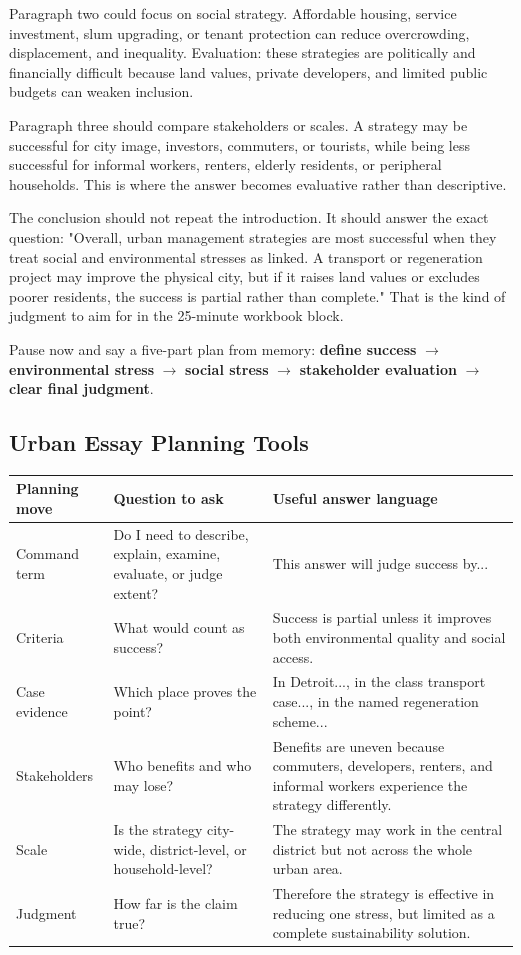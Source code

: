 \documentclass[11pt,a4paper]{article}
\newcommand{\term}[1]{\textcolor{HeadingBlue}{\textbf{#1}}}
\begin{document}
Paragraph two could focus on social strategy. Affordable housing, service
investment, slum upgrading, or tenant protection can reduce overcrowding,
displacement, and inequality. Evaluation: these strategies are politically and
financially difficult because land values, private developers, and limited
public budgets can weaken inclusion.

Paragraph three should compare stakeholders or scales. A strategy may be
successful for city image, investors, commuters, or tourists, while being less
successful for informal workers, renters, elderly residents, or peripheral
households. This is where the answer becomes evaluative rather than descriptive.

The conclusion should not repeat the introduction. It should answer the exact
question: "Overall, urban management strategies are most successful when they
treat social and environmental stresses as linked. A transport or regeneration
project may improve the physical city, but if it raises land values or excludes
poorer residents, the success is partial rather than complete." That is the
kind of judgment to aim for in the 25-minute workbook block.

Pause now and say a five-part plan from memory:
\term{define success} $\rightarrow$ \term{environmental stress}
$\rightarrow$ \term{social stress} $\rightarrow$ \term{stakeholder evaluation}
$\rightarrow$ \term{clear final judgment}.

\subsection{Urban Essay Planning Tools}

\begin{tabularx}{\textwidth}{L{0.2\textwidth}Y Y}
\toprule
\textbf{Planning move} & \textbf{Question to ask} & \textbf{Useful answer language} \\
\midrule
Command term & Do I need to describe, explain, examine, evaluate, or judge
extent? & This answer will judge success by... \\
Criteria & What would count as success? & Success is partial unless it improves
both environmental quality and social access. \\
Case evidence & Which place proves the point? & In Detroit..., in the class
transport case..., in the named regeneration scheme... \\
Stakeholders & Who benefits and who may lose? & Benefits are uneven because
commuters, developers, renters, and informal workers experience the strategy
differently. \\
Scale & Is the strategy city-wide, district-level, or household-level? & The
strategy may work in the central district but not across the whole urban area. \\
Judgment & How far is the claim true? & Therefore the strategy is effective in
reducing one stress, but limited as a complete sustainability solution. \\
\bottomrule
\end{tabularx}
\end{document}
